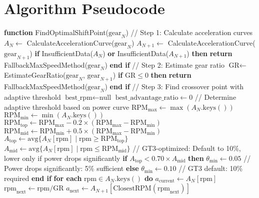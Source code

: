 \documentclass[12pt]{article}
\begin{document}
\section{Algorithm Pseudocode}

\begin{algorithmic}
\STATE \textbf{function} FindOptimalShiftPoint($\text{gear}_N$)
\STATE \quad // Step 1: Calculate acceleration curves
\STATE \quad $A_N \gets$ CalculateAccelerationCurve($\text{gear}_N$)
\STATE \quad $A_{N+1} \gets$ CalculateAccelerationCurve($\text{gear}_{N+1}$)
\STATE
\STATE \quad \textbf{if} InsufficientData($A_N$) \textbf{or} InsufficientData($A_{N+1}$) \textbf{then}
\STATE \quad \quad \textbf{return} FallbackMaxSpeedMethod($\text{gear}_N$)
\STATE \quad \textbf{end if}
\STATE
\STATE \quad // Step 2: Estimate gear ratio
\STATE \quad $\text{GR} \gets$ EstimateGearRatio($\text{gear}_N$, $\text{gear}_{N+1}$)
\STATE
\STATE \quad \textbf{if} $\text{GR} \leq 0$ \textbf{then}
\STATE \quad \quad \textbf{return} FallbackMaxSpeedMethod($\text{gear}_N$)
\STATE \quad \textbf{end if}
\STATE
\STATE \quad // Step 3: Find crossover point with adaptive threshold
\STATE \quad $\text{best\_rpm} \gets \text{null}$
\STATE \quad $\text{best\_advantage\_ratio} \gets 0$
\STATE
\STATE \quad // Determine adaptive threshold based on power curve
\STATE \quad $\text{RPM}_{\max} \gets \max(A_N.\text{keys}())$
\STATE \quad $\text{RPM}_{\min} \gets \min(A_N.\text{keys}())$
\STATE \quad $\text{RPM}_{\text{top}} \gets \text{RPM}_{\max} - 0.2 \times (\text{RPM}_{\max} - \text{RPM}_{\min})$
\STATE \quad $\text{RPM}_{\text{mid}} \gets \text{RPM}_{\min} + 0.5 \times (\text{RPM}_{\max} - \text{RPM}_{\min})$
\STATE
\STATE \quad $A_{\text{top}} \gets \text{avg}\{A_N[\text{rpm}] \mid \text{rpm} \geq \text{RPM}_{\text{top}}\}$
\STATE \quad $A_{\text{mid}} \gets \text{avg}\{A_N[\text{rpm}] \mid \text{rpm} \leq \text{RPM}_{\text{mid}}\}$
\STATE
\STATE \quad // GT3-optimized: Default to 10\%, lower only if power drops significantly
\STATE \quad \textbf{if} $A_{\text{top}} < 0.70 \times A_{\text{mid}}$ \textbf{then}
\STATE \quad \quad $\theta_{\min} \gets 0.05$ \quad // Power drops significantly: 5\% sufficient
\STATE \quad \textbf{else}
\STATE \quad \quad $\theta_{\min} \gets 0.10$ \quad // GT3 default: 10\% required
\STATE \quad \textbf{end if}
\STATE
\STATE \quad \textbf{for each} $\text{rpm} \in A_N.\text{keys}()$ \textbf{do}
\STATE \quad \quad $a_{\text{current}} \gets A_N[\text{rpm}]$
\STATE \quad \quad $\text{rpm}_{\text{next}} \gets \text{rpm} / \text{GR}$
\STATE \quad \quad $a_{\text{next}} \gets A_{N+1}[\text{ClosestRPM}(\text{rpm}_{\text{next}})]$

\end{algorithmic}
\end{document}
